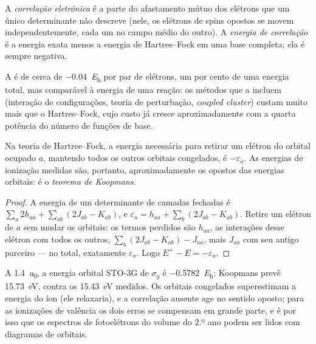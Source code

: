 \begin{definition}\label{def:b3:computational-chemistry:correlation}
A \emph{correlação eletrônica} é a parte do
afastamento mútuo dos elétrons que um único determinante não descreve (nele,
os elétrons de spins opostos se movem independentemente, cada um no campo
médio do outro). A \emph{energia de correlação} é a energia
exata menos a energia de Hartree--Fock em uma base completa; ela é sempre
negativa.
\end{definition}

A  é de cerca de \qty{-0.04}{\hartree} por par de
elétrons, um por cento de uma energia total, mas comparável à energia de uma
reação: os métodos que a incluem (interação de configurações, teoria de
perturbação, \textit{coupled cluster}) custam muito mais que o Hartree--Fock, cujo
custo já cresce aproximadamente com a quarta potência do número de funções de base.

\begin{theorem}\label{thm:b3:computational-chemistry:koopmans}
Na teoria de Hartree--Fock, a energia necessária para retirar um elétron do
orbital ocupado $a$, mantendo todos os outros orbitais congelados, é $-\varepsilon_a$. As
energias de ionização medidas são, portanto, aproximadamente os opostos das
energias orbitais: é o \emph{teorema de Koopmans}.
\end{theorem}

\begin{proof}
A energia de um determinante de camadas fechadas é $\sum_a2h_{aa} + \sum_{ab}(2J_{ab} -
K_{ab})$, e $\varepsilon_a = h_{aa} + \sum_b(2J_{ab} - K_{ab})$. Retire um elétron
de $a$ sem mudar os orbitais: os termos perdidos são $h_{aa}$, as
interações desse elétron com todos os outros, $\sum_b(2J_{ab} - K_{ab}) -
J_{aa}$, mais $J_{aa}$ com seu antigo parceiro --- no total, exatamente
$\varepsilon_a$. Logo $E^+ - E = -\varepsilon_a$.
\end{proof}

\begin{example}[Ionizando \ce{H2}]\label{ex:b3:computational-chemistry:koopmans}
A \qty{1.4}{\bohr}, a energia orbital STO-3G de $\sigma_g$ é
\qty{-0.5782}{\hartree}: Koopmans prevê \qty{15.73}{eV}, contra os
\qty{15.43}{eV} medidos. Os orbitais congelados superestimam a energia do íon
(ele relaxaria), e a correlação ausente age no sentido oposto; para as
ionizações de valência os dois erros se compensam em grande parte, e é por
isso que os espectros de fotoelétrons do volume do 2.º ano podem ser lidos com
diagramas de orbitais.
\end{example}

